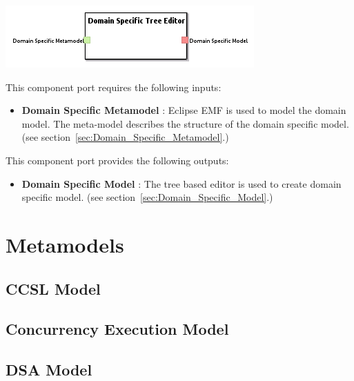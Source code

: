 \documentclass{gemoc} %
\begin{document}
\begin{center}
\includegraphics*[trim=0.0cm 0.0cm 0cm 0.0cm, clip=true]{../images/generated/Generated_Domain_Specific_Tree_Editor.png}
\end{center}

This component port requires the following inputs:
\begin{itemize}
  \item \textbf{Domain Specific Metamodel} :
Eclipse EMF is used to model the domain model. The meta-model describes the structure of the domain specific model.
(see section~\ref{sec:Domain_Specific_Metamodel}.)
\end{itemize}

This component port provides the following outputs:
\begin{itemize}
  \item \textbf{Domain Specific Model} :
The tree based editor is used to create domain specific model.
(see section~\ref{sec:Domain_Specific_Model}.)
\end{itemize}

\section{Metamodels}
\subsection{CCSL Model}
\label{sec:CCSL_Model}


\subsection{Concurrency Execution Model}
\label{sec:Concurrency_Execution_Model}


\subsection{DSA Model}
\label{sec:DSA_Model}
\end{document}
